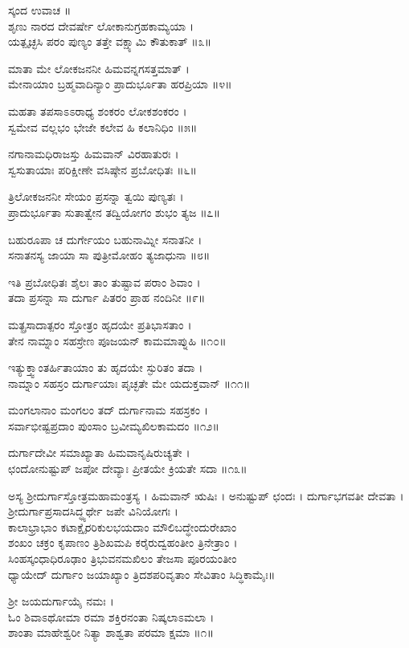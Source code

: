 ಸ್ಕಂದ ಉವಾಚ ॥\\
ಶೃಣು ನಾರದ ದೇವರ್ಷೇ ಲೋಕಾನುಗ್ರಹಕಾಮ್ಯಯಾ ।\\
ಯತ್ಪೃಚ್ಛಸಿ ಪರಂ ಪುಣ್ಯಂ ತತ್ತೇ ವಕ್ಷ್ಯಾಮಿ ಕೌತುಕಾತ್ ॥೩॥

ಮಾತಾ ಮೇ ಲೋಕಜನನೀ ಹಿಮವನ್ನಗಸತ್ತಮಾತ್ ।\\
ಮೇನಾಯಾಂ ಬ್ರಹ್ಮವಾದಿನ್ಯಾಂ ಪ್ರಾದುರ್ಭೂತಾ ಹರಪ್ರಿಯಾ ॥೪॥

ಮಹತಾ ತಪಸಾಽಽರಾಧ್ಯ ಶಂಕರಂ ಲೋಕಶಂಕರಂ ।\\
ಸ್ವಮೇವ ವಲ್ಲಭಂ ಭೇಜೇ ಕಲೇವ ಹಿ ಕಲಾನಿಧಿಂ ॥೫॥

ನಗಾನಾಮಧಿರಾಜಸ್ತು ಹಿಮವಾನ್ ವಿರಹಾತುರಃ ।\\
ಸ್ವಸುತಾಯಾಃ ಪರಿಕ್ಷೀಣೇ ವಸಿಷ್ಠೇನ ಪ್ರಬೋಧಿತಃ ॥೬॥

ತ್ರಿಲೋಕಜನನೀ ಸೇಯಂ ಪ್ರಸನ್ನಾ ತ್ವಯಿ ಪುಣ್ಯತಃ ।\\
ಪ್ರಾದುರ್ಭೂತಾ ಸುತಾತ್ವೇನ ತದ್ವಿಯೋಗಂ ಶುಭಂ ತ್ಯಜ ॥೭॥

ಬಹುರೂಪಾ ಚ ದುರ್ಗೇಯಂ ಬಹುನಾಮ್ನೀ ಸನಾತನೀ ।\\
ಸನಾತನಸ್ಯ ಜಾಯಾ ಸಾ ಪುತ್ರೀಮೋಹಂ ತ್ಯಜಾಧುನಾ ॥೮॥

ಇತಿ ಪ್ರಬೋಧಿತಃ ಶೈಲಃ ತಾಂ ತುಷ್ಟಾವ ಪರಾಂ ಶಿವಾಂ ।\\
ತದಾ ಪ್ರಸನ್ನಾ ಸಾ ದುರ್ಗಾ ಪಿತರಂ ಪ್ರಾಹ ನಂದಿನೀ ॥೯॥

ಮತ್ಪ್ರಸಾದಾತ್ಪರಂ ಸ್ತೋತ್ರಂ ಹೃದಯೇ ಪ್ರತಿಭಾಸತಾಂ ।\\
ತೇನ ನಾಮ್ನಾಂ ಸಹಸ್ರೇಣ ಪೂಜಯನ್ ಕಾಮಮಾಪ್ನುಹಿ ॥೧೦॥

ಇತ್ಯುಕ್ತ್ವಾಂತರ್ಹಿತಾಯಾಂ ತು ಹೃದಯೇ ಸ್ಫುರಿತಂ ತದಾ ।\\
ನಾಮ್ನಾಂ ಸಹಸ್ರಂ ದುರ್ಗಾಯಾಃ ಪೃಚ್ಛತೇ ಮೇ ಯದುಕ್ತವಾನ್ ॥೧೧॥

ಮಂಗಲಾನಾಂ ಮಂಗಲಂ ತದ್ ದುರ್ಗಾನಾಮ ಸಹಸ್ರಕಂ ।\\
ಸರ್ವಾಭೀಷ್ಟಪ್ರದಾಂ ಪುಂಸಾಂ ಬ್ರವೀಮ್ಯಖಿಲಕಾಮದಂ ॥೧೨॥

ದುರ್ಗಾದೇವೀ ಸಮಾಖ್ಯಾತಾ ಹಿಮವಾನೃಷಿರುಚ್ಯತೇ ।\\
ಛಂದೋನುಷ್ಟುಪ್ ಜಪೋ ದೇವ್ಯಾಃ ಪ್ರೀತಯೇ ಕ್ರಿಯತೇ ಸದಾ ॥೧೩॥

ಅಸ್ಯ ಶ್ರೀದುರ್ಗಾಸ್ತೋತ್ರಮಹಾಮಂತ್ರಸ್ಯ । ಹಿಮವಾನ್ ಋಷಿಃ । ಅನುಷ್ಟುಪ್ ಛಂದಃ । ದುರ್ಗಾಭಗವತೀ ದೇವತಾ । ಶ್ರೀದುರ್ಗಾಪ್ರಸಾದಸಿದ್ಧ್ಯರ್ಥೇ ಜಪೇ ವಿನಿಯೋಗಃ ।\\
ಕಾಲಾಭ್ರಾಭಾಂ ಕಟಾಕ್ಷೈರರಿಕುಲಭಯದಾಂ ಮೌಲಿಬದ್ಧೇಂದುರೇಖಾಂ\\
ಶಂಖಂ ಚಕ್ರಂ ಕೃಪಾಣಂ ತ್ರಿಶಿಖಮಪಿ ಕರೈರುದ್ವಹಂತೀಂ ತ್ರಿನೇತ್ರಾಂ ।\\
ಸಿಂಹಸ್ಕಂಧಾಧಿರೂಢಾಂ ತ್ರಿಭುವನಮಖಿಲಂ ತೇಜಸಾ ಪೂರಯಂತೀಂ\\
ಧ್ಯಾಯೇದ್ ದುರ್ಗಾಂ ಜಯಾಖ್ಯಾಂ ತ್ರಿದಶಪರಿವೃತಾಂ ಸೇವಿತಾಂ ಸಿದ್ಧಿಕಾಮೈಃ॥

ಶ್ರೀ ಜಯದುರ್ಗಾಯೈ ನಮಃ ।\\
ಓಂ ಶಿವಾಽಥೋಮಾ ರಮಾ ಶಕ್ತಿರನಂತಾ ನಿಷ್ಕಲಾಽಮಲಾ ।\\
ಶಾಂತಾ ಮಾಹೇಶ್ವರೀ ನಿತ್ಯಾ ಶಾಶ್ವತಾ ಪರಮಾ ಕ್ಷಮಾ ॥೧॥

